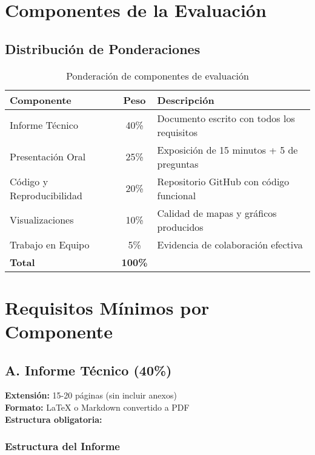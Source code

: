 \documentclass[11pt,letterpaper]{article}
\begin{document}
\section{Componentes de la Evaluación}

\subsection{Distribución de Ponderaciones}

\begin{table}[H]
\centering
\begin{tabular}{|l|c|p{8cm}|}
\hline
\rowcolor{usachblue!20}
\textbf{Componente} & \textbf{Peso} & \textbf{Descripción} \\
\hline
Informe Técnico & 40\% & Documento escrito con todos los requisitos \\
\hline
Presentación Oral & 25\% & Exposición de 15 minutos + 5 de preguntas \\
\hline
Código y Reproducibilidad & 20\% & Repositorio GitHub con código funcional \\
\hline
Visualizaciones & 10\% & Calidad de mapas y gráficos producidos \\
\hline
Trabajo en Equipo & 5\% & Evidencia de colaboración efectiva \\
\hline
\textbf{Total} & \textbf{100\%} & \\
\hline
\end{tabular}
\caption{Ponderación de componentes de evaluación}
\end{table}

\section{Requisitos Mínimos por Componente}

\subsection{A. Informe Técnico (40\%)}

\begin{requirements}
\textbf{Extensión:} 15-20 páginas (sin incluir anexos) \\
\textbf{Formato:} LaTeX o Markdown convertido a PDF \\
\textbf{Estructura obligatoria:}
\end{requirements}

\subsubsection{Estructura del Informe}
\end{document}
